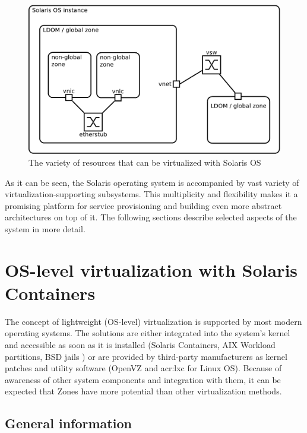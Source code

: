 \documentclass[11pt,openany]{book}
\begin{document}
      \begin{figure}[H]
        \begin{center}
          \includegraphics[width=.7\textwidth]{img/solaris/full-featured.pdf}
        \end{center}

        \caption{The variety of resources that can be virtualized with Solaris OS}
      \end{figure}

      As it can be seen, the Solaris operating system is accompanied by vast variety of virtualization-supporting
      subsystems. This multiplicity and flexibility makes it a promising platform for service provisioning and building
      even more abstract architectures on top of it. The following sections describe selected aspects of the system in
      more detail.


    \section{OS-level virtualization with Solaris Containers}
    \label{sec:sol:containers}

      The concept of lightweight (OS-level) virtualization is supported by most modern operating systems. The solutions
      are either integrated into the system's kernel and accessible as soon as it is installed (Solaris Containers, AIX
      Workload partitions, BSD jails \cite{kamp}) or are provided by third-party manufacturers as kernel patches and
      utility software (OpenVZ and \gls{acr:lxc} for Linux OS). Because of awareness of other system components and
      integration with them, it can be expected that Zones have more potential than other virtualization methods.


      \subsection{General information}
      \label{sub:}
\end{document}
